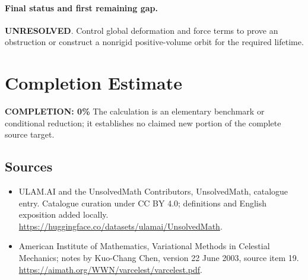 \documentclass[11pt]{article}
\begin{document}
\paragraph{Final status and first remaining gap.}
\textbf{UNRESOLVED}. Control global deformation and force terms to prove an obstruction or construct a nonrigid positive-volume orbit for the required lifetime.

\section{Completion Estimate}
\noindent\textbf{COMPLETION: 0\%}
The calculation is an elementary benchmark or conditional reduction; it establishes no claimed new portion of the complete source target.

\subsection{Sources}
\begin{itemize}
\item[\hypertarget{source:statement:1}{S1}] ULAM.AI and the UnsolvedMath Contributors, UnsolvedMath, catalogue entry. Catalogue curation under CC BY 4.0; definitions and English exposition added locally.
\url{https://huggingface.co/datasets/ulamai/UnsolvedMath}.
\item[\hypertarget{source:statement:2}{S2}] American Institute of Mathematics, Variational Methods in Celestial Mechanics; notes by Kuo-Chang Chen, version 22 June 2003, source item 19.
\url{https://aimath.org/WWN/varcelest/varcelest.pdf}.
\end{itemize}
\label{end:statement}
\end{document}
